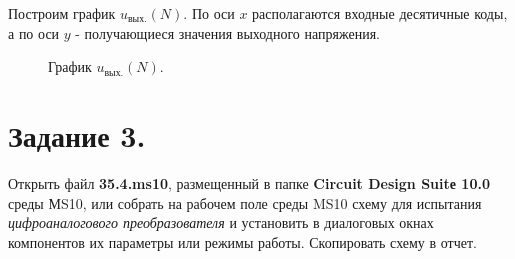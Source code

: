 \documentclass[spec, och, otchet, hidelinks]{SCWorks}
\begin{document}
\newpage

\par Построим график $ u_\text{вых.} (N) $. По оси $x$ располагаются входные десятичные коды, а по оси $y$ - получающиеся значения выходного напряжения.

\begin{figure}[h]
	\caption{График $u_\text{вых.}(N)$.}
\end{figure}

\newpage

\section*{Задание 3.}

Открыть файл \textbf{35.4.ms10}, размещенный в папке \textbf{Circuit Design Suitе 10.0} среды МS10, или собрать на рабочем поле среды MS10 схему для 
испытания \textit{цифроаналогового преобразователя} и установить в диалоговых окнах компонентов их параметры или режимы работы. Скопировать схему в 
отчет.
\end{document}
